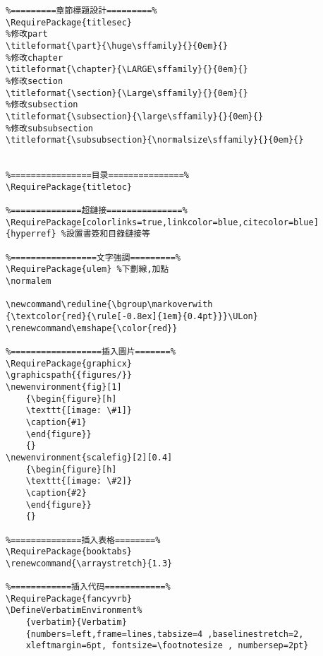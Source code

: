 \begin{verbatim}
%=========章節標題設計=========%
\RequirePackage{titlesec}
%修改part
\titleformat{\part}{\huge\sffamily}{}{0em}{} 
%修改chapter
\titleformat{\chapter}{\LARGE\sffamily}{}{0em}{} 
%修改section
\titleformat{\section}{\Large\sffamily}{}{0em}{}
%修改subsection
\titleformat{\subsection}{\large\sffamily}{}{0em}{}
%修改subsubsection
\titleformat{\subsubsection}{\normalsize\sffamily}{}{0em}{}


%================目录===============%
\RequirePackage{titletoc}

%==============超鏈接===============%
\RequirePackage[colorlinks=true,linkcolor=blue,citecolor=blue]{hyperref} %設置書簽和目錄鏈接等

%=================文字強調=========%
\RequirePackage{ulem} %下劃線,加點
\normalem

\newcommand\reduline{\bgroup\markoverwith
{\textcolor{red}{\rule[-0.8ex]{1em}{0.4pt}}}\ULon}
\renewcommand\emshape{\color{red}}

%==================插入圖片=======%
\RequirePackage{graphicx}
\graphicspath{{figures/}}
\newenvironment{fig}[1]
	{\begin{figure}[h]
	\texttt{[image: \#1]}
	\caption{#1}
	\end{figure}}
	{}	
\newenvironment{scalefig}[2][0.4]
	{\begin{figure}[h]
	\texttt{[image: \#2]}
	\caption{#2}
	\end{figure}}
	{}	

%==============插入表格========%
\RequirePackage{booktabs}
\renewcommand{\arraystretch}{1.3}

%============插入代码============%
\RequirePackage{fancyvrb} 
\DefineVerbatimEnvironment%
	{verbatim}{Verbatim}
	{numbers=left,frame=lines,tabsize=4 ,baselinestretch=2,
	xleftmargin=6pt, fontsize=\footnotesize , numbersep=2pt}  	
	

\end{verbatim}
